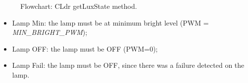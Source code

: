 \begin{figure}[H]
	\centering
	\caption{Flowchart: CLdr getLuxState method.}
	\label{fig:CLdrgetLuxState}
\end{figure}


\clearpage

\begin{itemize}
	\item Lamp Min: the lamp must be at minimum bright level (PWM = \textit{MIN\_BRIGHT\_PWM});
	\item Lamp OFF: the lamp must be OFF (PWM=0);
	\item Lamp Fail: the lamp must be OFF, since there was a failure detected on the lamp.
\end{itemize}

